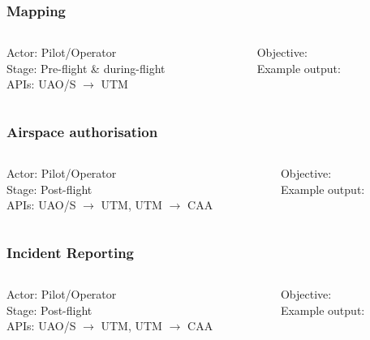 \documentclass[usenames,dvipsnames,aspectratio=169,serif]{beamer}
\begin{document}
\begin{frame}
   \frametitle{Mapping}
   \begin{columns}[t]
      \begin{column}{0.5\textwidth}
         Actor: Pilot/Operator \\
         Stage: Pre-flight \& during-flight \\
         APIs: UAO/S $\rightarrow$ UTM \\
      \end{column}
      \begin{column}{0.5\textwidth}
         Objective: \\
         Example output: \\
      \end{column}
   \end{columns}
\end{frame}

\begin{frame}
   \frametitle{Airspace authorisation}
   \begin{columns}[t]
      \begin{column}{0.5\textwidth}
         Actor: Pilot/Operator \\
         Stage: Post-flight \\
         APIs: UAO/S $\rightarrow$ UTM, UTM $\rightarrow$ CAA \\
      \end{column}
      \begin{column}{0.5\textwidth}
         Objective: \\
         Example output: \\
      \end{column}
   \end{columns}
\end{frame}

\begin{frame}
   \frametitle{Incident Reporting}
   \begin{columns}[t]
      \begin{column}{0.5\textwidth}
         Actor: Pilot/Operator \\
         Stage: Post-flight \\
         APIs: UAO/S $\rightarrow$ UTM, UTM $\rightarrow$ CAA \\
      \end{column}
      \begin{column}{0.5\textwidth}
         Objective: \\
         Example output: \\
      \end{column}
   \end{columns}
\end{frame}
\end{document}
